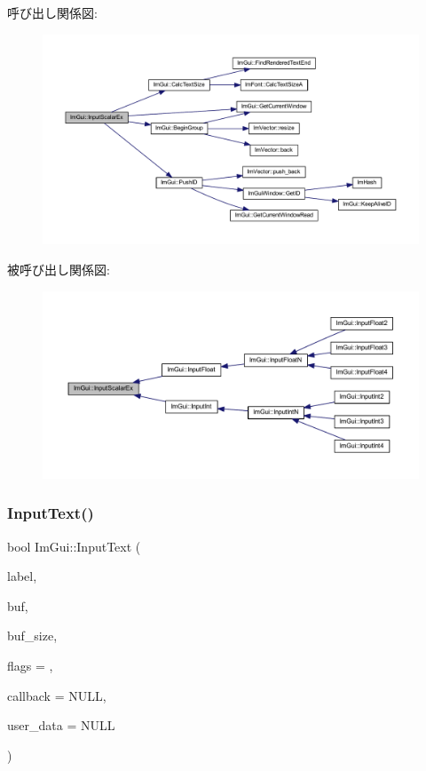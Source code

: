 呼び出し関係図\+:\nopagebreak
\begin{figure}[H]
\begin{center}
\leavevmode
\includegraphics[width=350pt]{namespace_im_gui_a08c243542b1678859cf0e065f9e43865_cgraph}
\end{center}
\end{figure}
被呼び出し関係図\+:\nopagebreak
\begin{figure}[H]
\begin{center}
\leavevmode
\includegraphics[width=350pt]{namespace_im_gui_a08c243542b1678859cf0e065f9e43865_icgraph}
\end{center}
\end{figure}
\mbox{\label{namespace_im_gui_af2faa757ec3f5e6379f15b0acfac48f7}} 
\subsubsection{\texorpdfstring{Input\+Text()}{InputText()}}
{\footnotesize\ttfamily bool Im\+Gui\+::\+Input\+Text (\begin{DoxyParamCaption}\item[{const char $\ast$}]{label,  }\item[{char $\ast$}]{buf,  }\item[{size\+\_\+t}]{buf\+\_\+size,  }\item[{\mbox{\hyperlink{imgui_8h_a7d2c6153a6b9b5d3178ce82434ac9fb8}{Im\+Gui\+Input\+Text\+Flags}}}]{flags = {},  }\item[{\mbox{\hyperlink{imgui_8h_ae9254e6ad76a9bc7abc20929e07b29c5}{Im\+Gui\+Text\+Edit\+Callback}}}]{callback = {\ttfamily NULL},  }\item[{void $\ast$}]{user\+\_\+data = {\ttfamily NULL} }\end{DoxyParamCaption})}



